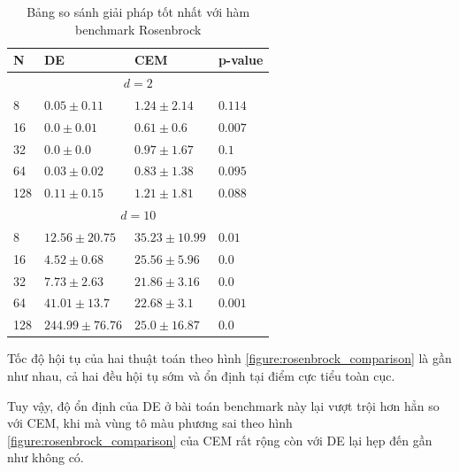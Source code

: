\documentclass[10pt]{report}
\begin{document}
\begin{table}[H]\centering
	\caption{Bảng so sánh giải pháp tốt nhất với hàm benchmark Rosenbrock}
	\begin{tabularx}{0.8\textwidth}{p{5em}XXl}
		\toprule
		\textbf{N} & \textbf{DE}                  & \textbf{CEM}                & \textbf{p-value}   \\
		\midrule
		\multicolumn{4}{c}{\(d = 2\)}                                                                \\
		\midrule
		8          & \(\mathbf{0.05 \pm 0.11}\)   & \(1.24 \pm 2.14\)           & \(0.114\)          \\
		16         & \(\mathbf{0.0 \pm 0.01}\)    & \(0.61 \pm 0.6\)            & \(\mathbf{0.007}\) \\
		32         & \(\mathbf{0.0 \pm 0.0}\)     & \(0.97 \pm 1.67\)           & \(0.1\)            \\
		64         & \(\mathbf{0.03 \pm 0.02}\)   & \(0.83 \pm 1.38\)           & \(0.095\)          \\
		128        & \(\mathbf{0.11 \pm 0.15}\)   & \(1.21 \pm 1.81\)           & \(0.088\)          \\
		\midrule
		\multicolumn{4}{c}{\(d = 10\)}                                                               \\
		\midrule
		8          & \(\mathbf{12.56 \pm 20.75}\) & \(35.23 \pm 10.99\)         & \(\mathbf{0.01}\)  \\
		16         & \(\mathbf{4.52 \pm 0.68}\)   & \(25.56 \pm 5.96\)          & \(\mathbf{0.0}\)   \\
		32         & \(\mathbf{7.73 \pm 2.63}\)   & \(21.86 \pm 3.16\)          & \(\mathbf{0.0}\)   \\
		64         & \(41.01 \pm 13.7\)           & \(\mathbf{22.68 \pm 3.1}\)  & \(\mathbf{0.001}\) \\
		128        & \(244.99 \pm 76.76\)         & \(\mathbf{25.0 \pm 16.87}\) & \(\mathbf{0.0}\)   \\
		\bottomrule
	\end{tabularx}
\end{table}

Tốc độ hội tụ của hai thuật toán theo hình \ref{figure:rosenbrock_comparison} là gần như nhau, cả hai đều hội tụ sớm và ổn định tại điểm cực tiểu toàn cục.

Tuy vậy, độ ổn định của DE ở bài toán benchmark này lại vượt trội hơn hẳn so với CEM, khi mà vùng tô màu phương sai theo hình \ref{figure:rosenbrock_comparison} của CEM rất rộng còn với DE lại hẹp đến gần như không có.
\end{document}
